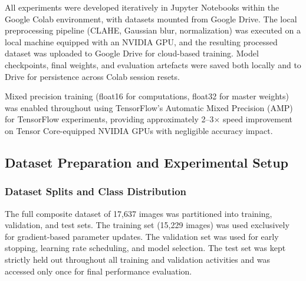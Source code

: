 All experiments were developed iteratively in Jupyter Notebooks within the Google Colab environment, with datasets mounted from Google Drive. The local preprocessing pipeline (CLAHE, Gaussian blur, normalization) was executed on a local machine equipped with an NVIDIA GPU, and the resulting processed dataset was uploaded to Google Drive for cloud-based training. Model checkpoints, final weights, and evaluation artefacts were saved both locally and to Drive for persistence across Colab session resets.

Mixed precision training (float16 for computations, float32 for master weights) was enabled throughout using TensorFlow's Automatic Mixed Precision (AMP) for TensorFlow experiments, providing approximately 2--3$\times$ speed improvement on Tensor Core-equipped NVIDIA GPUs with negligible accuracy impact.

\subsection{Dataset Preparation and Experimental Setup}

\subsubsection{Dataset Splits and Class Distribution}

The full composite dataset of 17,637 images was partitioned into training, validation, and test sets. The training set (15,229 images) was used exclusively for gradient-based parameter updates. The validation set was used for early stopping, learning rate scheduling, and model selection. The test set was kept strictly held out throughout all training and validation activities and was accessed only once for final performance evaluation.

